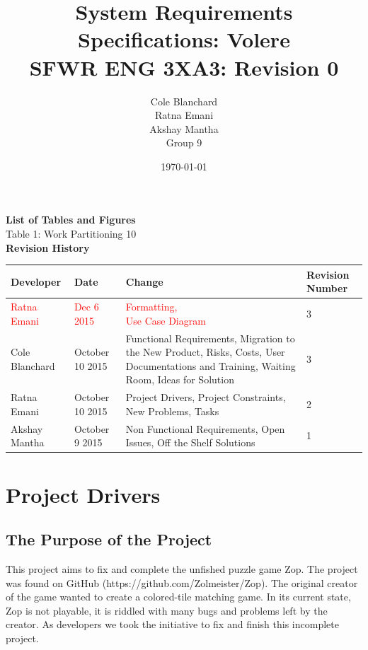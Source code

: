 \documentclass[12pt]{article}
\begin{document}
\title{System Requirements Specifications: Volere\\SFWR ENG 3XA3: Revision 0}
\author{Cole Blanchard\\Ratna Emani\\Akshay Mantha\\Group 9}
\date{\today}
\maketitle
\pagebreak

\tableofcontents
\textbf{List of Tables and Figures}\\
Table 1: Work Partitioning \hfill \hfill 10\\

\newpage
\textbf{Revision History}\\
\begin{center}
 \begin{tabular}{|C{3cm}|C{3cm}|C{3cm}|C{3cm}|}
 \hline
 \textbf{Developer} & \textbf{Date} & \textbf{Change} & \textbf{Revision Number}\\
 \hline \hline
 \textcolor{red}{Ratna Emani}& \textcolor{red}{Dec 6 2015} & \textcolor{red}{Formatting, \newline Use Case Diagram} & 3\\
 \hline
 Cole Blanchard & October 10 2015 & Functional Requirements, Migration to the New Product, Risks, Costs, User Documentations and Training, Waiting Room, Ideas for Solution & 3\\
 \hline
 Ratna Emani & October 10 2015 & Project Drivers, Project Constraints, New Problems, Tasks & 2\\
 \hline
 Akshay Mantha & October 9 2015 & Non Functional Requirements, Open Issues, Off the Shelf Solutions & 1\\
 \hline
 \end{tabular}
\end{center}

\pagebreak

\section{Project Drivers}
\subsection{The Purpose of the Project}
This project aims to fix and complete the unfished puzzle game Zop. The project was found on GitHub (https://github.com/Zolmeister/Zop). The original creator of the game wanted to create a colored-tile matching game. In its current state, Zop is not playable, it is riddled with many bugs and problems left by the creator. As developers we took the initiative to fix and finish this incomplete project.
\end{document}
